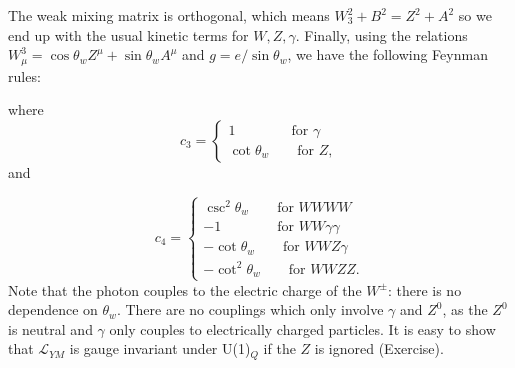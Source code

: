 \documentclass[a4paper,12pt]{article}
\begin{document}
The weak mixing matrix is orthogonal, which means $W_3^2 + B^2 = Z^2 + A^2$ so we end up with the usual kinetic terms for $W, Z, \gamma$. Finally, using the relations $W_\mu^3 = \cos\theta_wZ^\mu + \sin\theta_w A^\mu$ and $g=e/\sin\theta_w$, we have the following Feynman rules:
\newline
\begin{figure}[!h]
  \centering
  \hfill
\end{figure}
\newline
where 
\begin{equation}
c_3 =
\begin{cases}
1 \qquad \qquad \text{for } \gamma\\
\cot\theta_w \qquad \text{for } Z,
\end{cases}
\end{equation}
and

\begin{equation}
c_4 =
\begin{cases}
\csc^2\theta_w \qquad \text{for } WWWW\\
-1 \qquad \qquad \text{for } WW\gamma \gamma \\
-\cot\theta_w \qquad \text{for } WWZ \gamma \\
-\cot^2\theta_w \qquad \text{for } WWZZ.
\end{cases}
\end{equation}
Note that the photon couples to the electric charge of the $W^\pm$: there is no dependence on $\theta_w$. There are no couplings which only involve $\gamma$ and $Z^0$, as the $Z^0$ is neutral and $\gamma$ only couples to electrically charged particles. It is easy to show that $\mathcal{L}_{YM}$ is gauge invariant under U(1)$_Q$ if the $Z$ is ignored (Exercise). 
%
\end{document}
